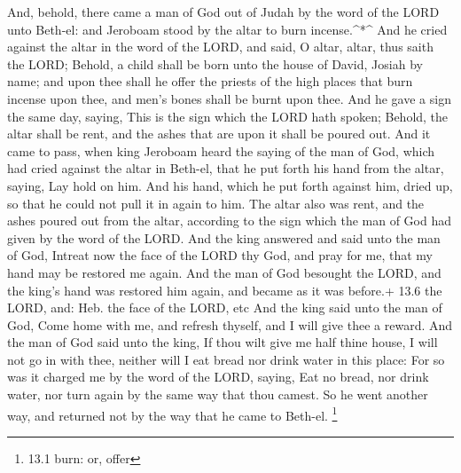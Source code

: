  And, behold, there came a man of God out of Judah by the
word of the LORD unto Beth-el: and Jeroboam stood by the altar to burn
incense.\^{}*\^{}  And he cried against the altar in the
word of the LORD, and said, O altar, altar, thus saith the LORD; Behold,
a child shall be born unto the house of David, Josiah by name; and upon
thee shall he offer the priests of the high places that burn incense
upon thee, and men's bones shall be burnt upon thee.  And he
gave a sign the same day, saying, This is the sign which the LORD hath
spoken; Behold, the altar shall be rent, and the ashes that are upon it
shall be poured out.  And it came to pass, when king
Jeroboam heard the saying of the man of God, which had cried against the
altar in Beth-el, that he put forth his hand from the altar, saying, Lay
hold on him. And his hand, which he put forth against him, dried up, so
that he could not pull it in again to him.  The altar also
was rent, and the ashes poured out from the altar, according to the sign
which the man of God had given by the word of the LORD.  And
the king answered and said unto the man of God, Intreat now the face of
the LORD thy God, and pray for me, that my hand may be restored me
again. And the man of God besought the LORD, and the king's hand was
restored him again, and became as it was before.+ 13.6 the LORD, and:
Heb. the face of the LORD, etc  And the king said unto the
man of God, Come home with me, and refresh thyself, and I will give thee
a reward.  And the man of God said unto the king, If thou
wilt give me half thine house, I will not go in with thee, neither will
I eat bread nor drink water in this place:  For so was it
charged me by the word of the LORD, saying, Eat no bread, nor drink
water, nor turn again by the same way that thou camest.  So
he went another way, and returned not by the way that he came to
Beth-el. \footnote{13.1 burn: or, offer}

